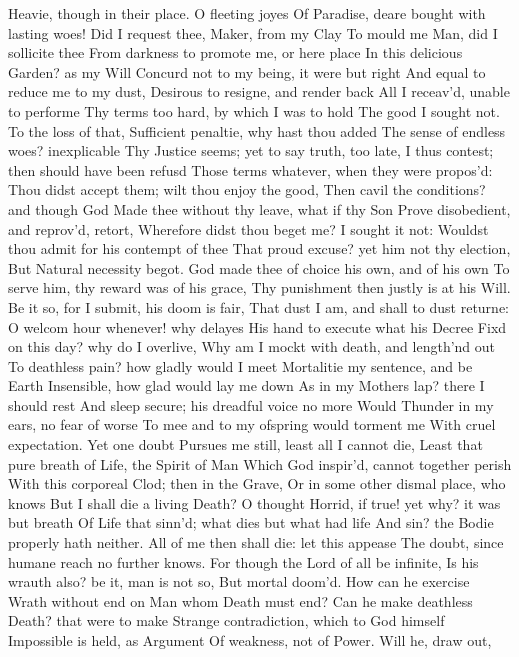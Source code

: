 \documentclass[11pt]{book}
\newcounter {last}
\begin{document}
Heavie, though in their place.  O fleeting joyes 
Of Paradise, deare bought with lasting woes! 
Did I request thee, Maker, from my Clay 
To mould me Man, did I sollicite thee 
From darkness to promote me, or here place 
In this delicious Garden? as my Will 
Concurd not to my being, it were but right 
And equal to reduce me to my dust, 
Desirous to resigne, and render back 
All I receav'd, unable to performe 
Thy terms too hard, by which I was to hold 
The good I sought not.  To the loss of that, 
Sufficient penaltie, why hast thou added 
The sense of endless woes? inexplicable 
Thy Justice seems; yet to say truth, too late, 
I thus contest; then should have been refusd 
Those terms whatever, when they were propos'd: 
Thou didst accept them; wilt thou enjoy the good, 
Then cavil the conditions? and though God 
Made thee without thy leave, what if thy Son 
Prove disobedient, and reprov'd, retort, 
Wherefore didst thou beget me? I sought it not: 
Wouldst thou admit for his contempt of thee 
That proud excuse? yet him not thy election, 
But Natural necessity begot. 
God made thee of choice his own, and of his own 
To serve him, thy reward was of his grace, 
Thy punishment then justly is at his Will. 
Be it so, for I submit, his doom is fair, 
That dust I am, and shall to dust returne: 
O welcom hour whenever! why delayes 
His hand to execute what his Decree 
Fixd on this day? why do I overlive, 
Why am I mockt with death, and length'nd out 
To deathless pain? how gladly would I meet 
Mortalitie my sentence, and be Earth 
Insensible, how glad would lay me down 
As in my Mothers lap? there I should rest 
And sleep secure; his dreadful voice no more 
Would Thunder in my ears, no fear of worse 
To mee and to my ofspring would torment me 
With cruel expectation.  Yet one doubt 
Pursues me still, least all I cannot die, 
Least that pure breath of Life, the Spirit of Man 
Which God inspir'd, cannot together perish 
With this corporeal Clod; then in the Grave, 
Or in some other dismal place, who knows 
But I shall die a living Death?  O thought 
Horrid, if true! yet why? it was but breath 
Of Life that sinn'd; what dies but what had life 
And sin? the Bodie properly hath neither. 
All of me then shall die: let this appease 
The doubt, since humane reach no further knows. 
For though the Lord of all be infinite, 
Is his wrauth also? be it, man is not so, 
But mortal doom'd.  How can he exercise 
Wrath without end on Man whom Death must end? 
Can he make deathless Death? that were to make 
Strange contradiction, which to God himself 
Impossible is held, as Argument 
Of weakness, not of Power.  Will he, draw out, 
\end{document}
